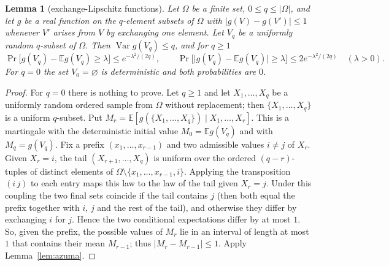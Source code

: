 \documentclass[11pt]{article}
\newtheorem{lemma}{Lemma}[section]
\theoremstyle{definition}
\newcommand{\E}{\mathbb E}
\newcommand{\abs}[1]{\lvert #1\rvert}
\newcommand{\Var}{\operatorname{Var}}
\begin{document}
\begin{lemma}[exchange-Lipschitz functions]\label{lem:subsets}
Let $\Omega$ be a finite set, $0\le q\le\abs\Omega$, and let $g$ be a real function on the $q$-element subsets of
$\Omega$ with $\abs{g(V)-g(V')}\le1$ whenever $V'$ arises from $V$ by exchanging one element. Let $V_q$ be a uniformly
random $q$-subset of $\Omega$. Then $\Var g(V_q)\le q$, and for $q\ge1$
\[
 \Pr\bigl[g(V_q)-\E g(V_q)\ge\lambda\bigr]\le e^{-\lambda^2/(2q)},\qquad
 \Pr\bigl[\abs{g(V_q)-\E g(V_q)}\ge\lambda\bigr]\le2e^{-\lambda^2/(2q)}\quad(\lambda>0).
\]
For $q=0$ the set $V_0=\varnothing$ is deterministic and both probabilities are $0$.
\end{lemma}
\begin{proof}
For $q=0$ there is nothing to prove. Let $q\ge1$ and let
$X_1,\dots,X_q$ be a uniformly random ordered sample from $\Omega$ without replacement; then
$\{X_1,\dots,X_q\}$ is a uniform $q$-subset. Put $M_r=\E[g(\{X_1,\dots,X_q\})\mid X_1,\dots,X_r]$. This is a martingale
with the deterministic initial value $M_0=\E g(V_q)$ and with $M_q=g(V_q)$. Fix a prefix $(x_1,\dots,x_{r-1})$ and two admissible values $i\ne j$ of $X_r$.
Given $X_r=i$, the tail $(X_{r+1},\dots,X_q)$ is uniform over the ordered $(q-r)$-tuples of distinct elements of
$\Omega\setminus\{x_1,\dots,x_{r-1},i\}$. Applying the transposition $(i\,j)$ to each entry maps this law to the law
of the tail given $X_r=j$. Under this coupling the two final sets coincide if the tail contains $j$ (then both equal
the prefix together with $i$, $j$ and the rest of the tail), and otherwise they differ by exchanging $i$ for $j$.
Hence the two conditional expectations differ by at most $1$. So, given the prefix, the possible values of $M_r$
lie in an interval of length at most $1$ that contains their mean $M_{r-1}$; thus $\abs{M_r-M_{r-1}}\le1$. Apply
Lemma~\ref{lem:azuma}.
\end{proof}
\end{document}
